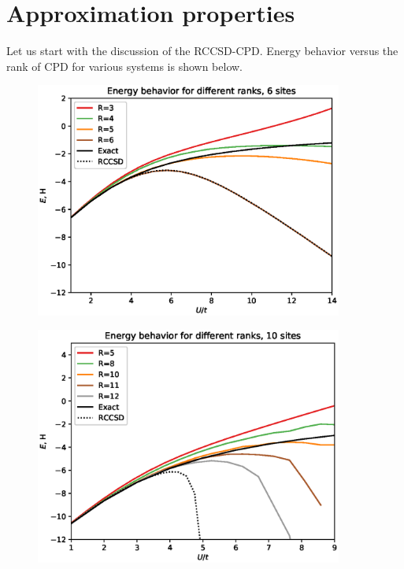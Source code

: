 \documentclass[a4paper,10pt]{article}
\begin{document}
\section{Approximation properties}
Let us start with the discussion of the RCCSD-CPD. Energy behavior versus the rank of CPD for various 
systems is shown below. 
 
\begin{figure}[!htb]
\centering
\includegraphics[width=0.9\textwidth]{figures/energy_vs_u_6_sites.eps}
\end{figure}

\begin{figure}[!htb]
\centering
\includegraphics[width=0.9\textwidth]{figures/energy_vs_u_10_sites.eps}
\end{figure}
\end{document}
